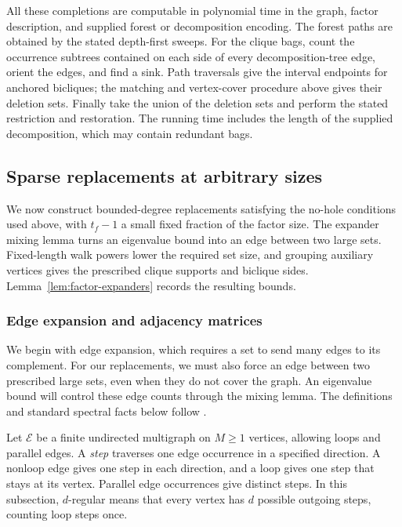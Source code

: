 All these completions are computable in polynomial time in the graph,
factor description, and supplied forest or decomposition encoding.
The forest paths are obtained by the stated depth-first sweeps.
For the clique bags, count the occurrence subtrees contained on each
side of every decomposition-tree edge, orient the edges, and find a
sink. Path traversals give the interval endpoints for anchored bicliques;
the matching and vertex-cover procedure above gives their deletion sets.
Finally take the union of the deletion sets and perform the stated
restriction and restoration. The running time includes the length of
the supplied decomposition, which may contain redundant bags.

\subsection{Sparse replacements at arbitrary sizes}

We now construct bounded-degree replacements satisfying the no-hole
conditions used above, with $t_f-1$ a small fixed fraction of the
factor size. The expander mixing lemma turns an eigenvalue bound
into an edge between two large sets. Fixed-length walk powers lower
the required set size, and grouping auxiliary vertices gives the
prescribed clique supports and biclique sides.
Lemma~\ref{lem:factor-expanders} records the resulting bounds.

\subsubsection{Edge expansion and adjacency matrices}

We begin with edge expansion, which requires a set to send many
edges to its complement. For our replacements, we must also force
an edge between two prescribed large sets, even when they do not
cover the graph. An eigenvalue bound will control these edge counts
through the mixing lemma.
The definitions and standard spectral facts below follow
\cite[Section~2]{HLW2006}.

Let $\mathcal E$ be a finite undirected multigraph on $M\ge1$
vertices, allowing loops and parallel edges. A \emph{step} traverses
one edge occurrence in a specified direction. A nonloop edge gives
one step in each direction, and a loop gives one step that stays at
its vertex. Parallel edge occurrences give distinct steps. In this
subsection, $d$-regular means that every vertex has $d$ possible
outgoing steps, counting loop steps once.

